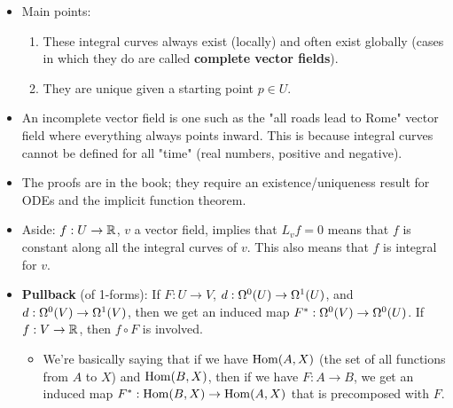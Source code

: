 \documentclass[../notes.tex]{subfiles}
\begin{document}
\begin{itemize}
\begin{itemize}
    \end{itemize}
    \item Main points:
    \begin{enumerate}
        \item These integral curves always exist (locally) and often exist globally (cases in which they do are called \textbf{complete vector fields}).
        \item They are unique given a starting point $p\in U$.
    \end{enumerate}
    \item An incomplete vector field is one such as the "all roads lead to Rome" vector field where everything always points inward. This is because integral curves cannot be defined for all "time" (real numbers, positive and negative).
    \item The proofs are in the book; they require an existence/uniqueness result for ODEs and the implicit function theorem.
    \item Aside: $f:U\to\R$, $v$ a vector field, implies that $L_vf=0$ means that $f$ is constant along all the integral curves of $v$. This also means that $f$ is integral for $v$.
    \item \textbf{Pullback} (of 1-forms): If $F:U\to V$, $d:\ome[0]{U}\to\ome[1]{U}$, and $d:\ome[0]{V}\to\ome[1]{V}$, then we get an induced map $F^*:\ome[0]{V}\to\ome[0]{U}$. If $f:V\to\R$, then $f\circ F$ is involved.
    \begin{itemize}
        \item We're basically saying that if we have $\Hom(A,X)$ (the set of all functions from $A$ to $X$) and $\Hom(B,X)$, then if we have $F:A\to B$, we get an induced map $F^*:\Hom(B,X)\to\Hom(A,X)$ that is precomposed with $F$.
    \end{itemize}
\end{itemize}
\end{document}
